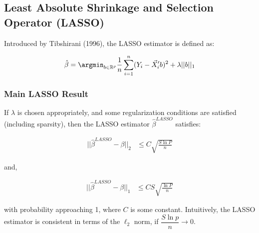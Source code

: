 \subsection{Least Absolute Shrinkage and Selection Operator (LASSO)}

Introduced by Tibshirani (1996), the LASSO estimator is defined as:

\begin{align*}
\hat{\beta} = \argmin_{b \in \mathbb{R}^p} 
\frac{1}{n} \sum_{i=1}^n (Y_i - \Vec{X}_i'b)^2 + \lambda ||b||_1
\end{align*}

\subsubsection{Main LASSO Result}

If $\lambda$ is chosen appropriately, and some regularization conditions are satisfied (including sparsity), then the LASSO estimator $\hat{\beta}^{LASSO}$ satisfies:

\begin{align*}
||\hat{\beta}^{LASSO} - \beta||_2 &\leq C \sqrt{\frac{S \ln P}{n}}
\end{align*} 

and,

\begin{align*}
||\hat{\beta}^{LASSO} - \beta||_1 &\leq CS \sqrt{\frac{\ln P}{n}}
\end{align*} 

with probability approaching 1, where $C$ is some constant. Intuitively, the LASSO estimator is consistent in terms of the $\ell_2$ norm, if $\dfrac{S \ln p}{n} \to 0$.
